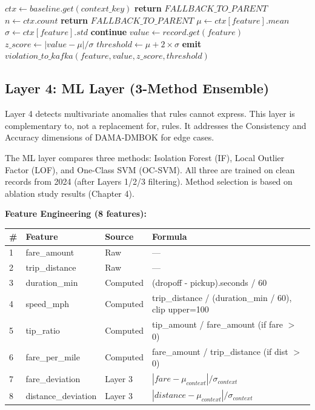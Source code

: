 \begin{algorithm}[H]
\caption{Context-Aware Z-Score Check}
\label{alg:ctx_zscore}
\begin{algorithmic}[1]
    \State $ctx \gets baseline.get(context\_key)$
        \State \textbf{return} $FALLBACK\_TO\_PARENT$
    \EndIf
    \State $n \gets ctx.count$
        \State \textbf{return} $FALLBACK\_TO\_PARENT$
    \EndIf
        \State $\mu \gets ctx[feature].mean$
        \State $\sigma \gets ctx[feature].std$
            \State \textbf{continue}
        \EndIf
        \State $value \gets record.get(feature)$
        \State $z\_score \gets |value - \mu| / \sigma$
        \State $threshold \gets \mu + 2 \times \sigma$
            \State \textbf{emit} $violation\_to\_kafka(feature, value, z\_score, threshold)$
        \EndIf
    \EndFor
\EndProcedure
\end{algorithmic}
\end{algorithm}

\subsection{Layer 4: ML Layer (3-Method Ensemble)}

Layer 4 detects multivariate anomalies that rules cannot express. This layer is complementary to, not a replacement for, rules. It addresses the Consistency and Accuracy dimensions of DAMA-DMBOK for edge cases.

The ML layer compares three methods: Isolation Forest (IF), Local Outlier Factor (LOF), and One-Class SVM (OC-SVM). All three are trained on clean records from 2024 (after Layers 1/2/3 filtering). Method selection is based on ablation study results (Chapter 4).

\textbf{Feature Engineering (8 features):}
\begin{longtable}{|m{1cm}|m{4cm}|m{4cm}|m{4cm}|}
\hline
\textbf{\#} & \textbf{Feature} & \textbf{Source} & \textbf{Formula} \\ \hline
1 & fare\_amount & Raw & --- \\ \hline
2 & trip\_distance & Raw & --- \\ \hline
3 & duration\_min & Computed & (dropoff - pickup).seconds / 60 \\ \hline
4 & speed\_mph & Computed & trip\_distance / (duration\_min / 60), clip upper=100 \\ \hline
5 & tip\_ratio & Computed & tip\_amount / fare\_amount (if fare $>$ 0) \\ \hline
6 & fare\_per\_mile & Computed & fare\_amount / trip\_distance (if dist $>$ 0) \\ \hline
7 & fare\_deviation & Layer 3 & $|fare - \mu_{context}| / \sigma_{context}$ \\ \hline
8 & distance\_deviation & Layer 3 & $|distance - \mu_{context}| / \sigma_{context}$ \\ \hline
\end{longtable}

